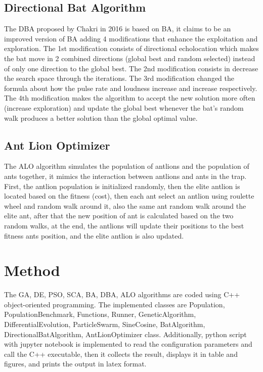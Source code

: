 \documentclass[12pt]{article}
\begin{document}
\subsection{Directional Bat Algorithm}
The DBA proposed by Chakri in 2016 is based on BA, it claims to be an improved version of BA adding 4 modifications that enhance the exploitation and exploration. The 1st modification consists of directional echolocation which makes the bat move in 2 combined directions (global best and random selected) instead of only one direction to the global best. The 2nd modification consists in decrease the search space through the iterations. The 3rd modification changed the formula about how the pulse rate and loudness increase and increase respectively. The 4th modification makes the algorithm to accept the new solution more often (increase exploration) and update the global best whenever the bat's random walk produces a better solution than the global optimal value.

\subsection{Ant Lion Optimizer}

The ALO algorithm simulates the population of antlions and the population of ants together, it mimics the interaction between antlions and ants in the trap. First, the antlion population is initialized randomly, then the elite antlion is located based on the fitness (cost), then each ant select an antlion using roulette wheel and random walk around it, also the same ant random walk around the elite ant, after that the new position of ant is calculated based on the two random walks, at the end, the antlions will update their positions to the best fitness ants position, and the elite antlion is also updated. 


     


    
    \section{Method}
    
The GA, DE, PSO, SCA, BA, DBA, ALO algorithms are coded using C++ object-oriented programming. The implemented classes are Population, PopulationBenchmark,  Functions, Runner, GeneticAlgorithm, DifferentialEvolution, ParticleSwarm, SineCosine, BatAlgorithm, DirectionalBatAlgorithm, AntLionOptimizer class. Additionally, python script with jupyter notebook is implemented to read the configuration parameters and call the C++ executable, then it collects the result, displays it in table and figures, and prints the output in latex format.
    
\end{document}
